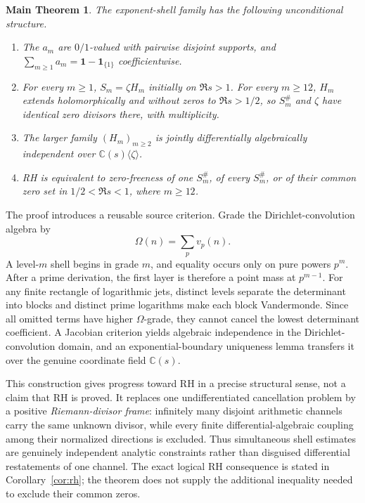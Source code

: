 \documentclass[11pt]{article}
\newtheorem*{maintheorem}{Main Theorem}
\theoremstyle{definition}
\theoremstyle{remark}
\newcommand{\C}{\mathbb C}
\begin{document}
\begin{maintheorem}\label{thm:main-intro}
The exponent-shell family has the following unconditional structure.
\begin{enumerate}[label=\textup{(\alph*)}]
\item The \(a_m\) are \(0/1\)-valued with pairwise disjoint supports, and
\(\sum_{m\geq1}a_m=\mathbf1-\mathbf1_{\{1\}}\) coefficientwise.
\item For every \(m\geq1\), \(S_m=\zeta H_m\) initially on \(\Re s>1\).  For every
\(m\geq12\), \(H_m\) extends holomorphically and without zeros to \(\Re s>1/2\), so
\(S_m^\#\) and \(\zeta\) have identical zero divisors there, with multiplicity.
\item The larger family \((H_m)_{m\geq2}\) is jointly differentially algebraically independent
over \(\C(s)\langle\zeta\rangle\).
\item RH is equivalent to zero-freeness of one \(S_m^\#\), of every \(S_m^\#\), or of their
common zero set in \(1/2<\Re s<1\), where \(m\geq12\).
\end{enumerate}
\end{maintheorem}

The proof introduces a reusable source criterion.  Grade the Dirichlet-convolution algebra by
\[
 \Omega(n)=\sum_pv_p(n).
 \tag{1.7}
\]
A level-\(m\) shell begins in grade \(m\), and equality occurs only on pure powers \(p^m\).
After a prime derivation, the first layer is therefore a point mass at \(p^{m-1}\).
For any finite rectangle of logarithmic jets, distinct levels separate the determinant into
blocks and distinct prime logarithms make each block Vandermonde.  Since all omitted terms have
higher \(\Omega\)-grade, they cannot cancel the lowest determinant coefficient.  A Jacobian
criterion yields algebraic independence in the Dirichlet-convolution domain, and an
exponential-boundary uniqueness lemma transfers it over the genuine coordinate field
\(\C(s)\).

This construction gives progress toward RH in a precise structural sense, not a claim that RH is
proved.  It replaces one undifferentiated cancellation problem by a positive
\emph{Riemann-divisor frame}: infinitely many disjoint arithmetic channels carry the same
unknown divisor, while every finite differential-algebraic coupling among their normalized
directions is excluded.  Thus simultaneous shell estimates are genuinely independent analytic
constraints rather than disguised differential restatements of one channel.  The exact logical
RH consequence is stated in Corollary~\ref{cor:rh}; the theorem does not supply the additional
inequality needed to exclude their common zeros.
\end{document}
